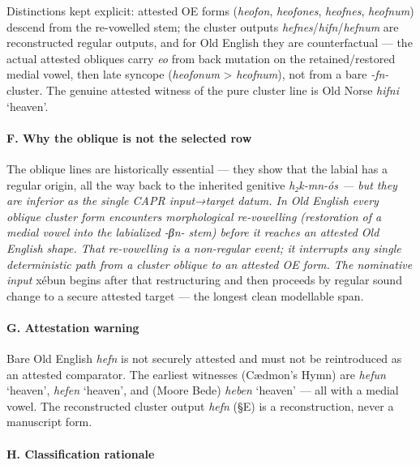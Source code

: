 \documentclass[
  british,
  a4paper,
]{article}
\begin{document}
Distinctions kept explicit: attested OE forms (\emph{heofon},
\emph{heofones}, \emph{heofnes}, \emph{heofnum}) descend from the
re-vowelled stem; the cluster outputs
\emph{hefnes}/\emph{hifn}/\emph{hefnum} are reconstructed regular
outputs, and for Old English they are counterfactual --- the actual
attested obliques carry \emph{eo} from back mutation on the
retained/\hspace{0pt}restored medial vowel, then late syncope
(\emph{heofonum} \textgreater{} \emph{heofnum}), not from a bare
\emph{-fn-} cluster. The genuine attested witness of the pure cluster
line is Old Norse {\emph{hifni}} `heaven'.

\paragraph{F. Why the oblique is not the selected
row}\label{f.-why-the-oblique-is-not-the-selected-row}

The oblique lines are historically essential --- they show that the
labial has a regular origin, all the way back to the inherited genitive
\emph{h₂k-mn-ós --- but they are inferior as the single CAPR
input→target datum. In Old English every oblique cluster form encounters
morphological re-vowelling (restoration of a medial vowel into the
labialized \emph{-βn-} stem) before it reaches an attested Old English
shape. That re-vowelling is a non-regular event; it interrupts any
single deterministic path from a cluster oblique to an attested OE form.
The nominative input }xébun begins after that restructuring and then
proceeds by regular sound change to a secure attested target --- the
longest clean modellable span.

\paragraph{G. Attestation warning}\label{g.-attestation-warning}

Bare Old English \emph{hefn} is not securely attested and must not be
reintroduced as an attested comparator. The earliest witnesses (Cædmon's
Hymn) are {\emph{hefun}} `heaven', {\emph{hefen}} `heaven', and (Moore
Bede) {\emph{heben}} `heaven' --- all with a medial vowel. The
reconstructed cluster output \emph{hefn} (§E) is a reconstruction, never
a manuscript form.

\paragraph{H. Classification
rationale}\label{h.-classification-rationale}
\end{document}
